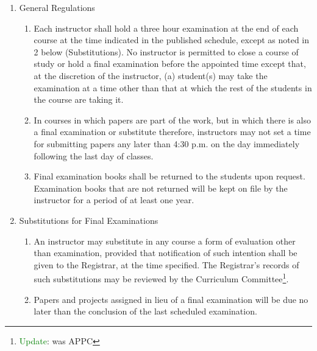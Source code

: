 \documentclass{manual}
\newcommand{\oldbreak}[1]{}
\newcommand{\editRemark}[3]{\textcolor{green}{#2}\footnote{\textcolor{green}{#1}: #3}}
\newcommand{\editRemove}[1]{}
\newcommand{\itemLevelB}{\arabic*)}
\newcommand{\itemRefB}{\arabic*}
\begin{document}
\begin{enumerate}[label=\alph*]
\item General Regulations

\begin{enumerate}[label=\itemLevelB,ref=\itemRefB]
\item Each instructor shall hold a three hour examination at the end of each course at the time indicated in the published schedule, except as noted in 2 below (Substitutions). No instructor is permitted to close a course of study or hold a final examination before the appointed time except that, at the discretion of the instructor, (a) student(s) may take the examination at a time other than that at which the rest of the students in the course are taking it.
\editRemove{2) In two-semester courses, examinations shall be held at the end of each semester, but the final examination at the end of the second semester shall be upon the work of the entire course, and the student's permanent grade shall be based on the entire course.}
\item  In courses in which papers are part of the work, but in which there is also a final examination or substitute therefore, instructors may not set a time for submitting papers any later than 4:30 p.m. on the day immediately following the last day of classes.
\item  Final examination books shall be returned to the students upon request. Examination books that are not returned will be kept on file by the instructor for a period of at least one year.
\end{enumerate}

\item Substitutions for Final Examinations

\begin{enumerate}[label=\itemLevelB,ref=\itemRefB]
\item An instructor may substitute in any course a form of evaluation other than examination, provided that notification of such intention shall be given to the Registrar, at the time specified. The Registrar's records of such substitutions may be reviewed by the Curriculum Committee\editRemark{Update}{}{was APPC}.
\item Papers and projects assigned in lieu of a final examination will be due no later than the conclusion of the last scheduled examination.
\end{enumerate}

\oldbreak{VII-6}


\end{enumerate}
\end{document}
